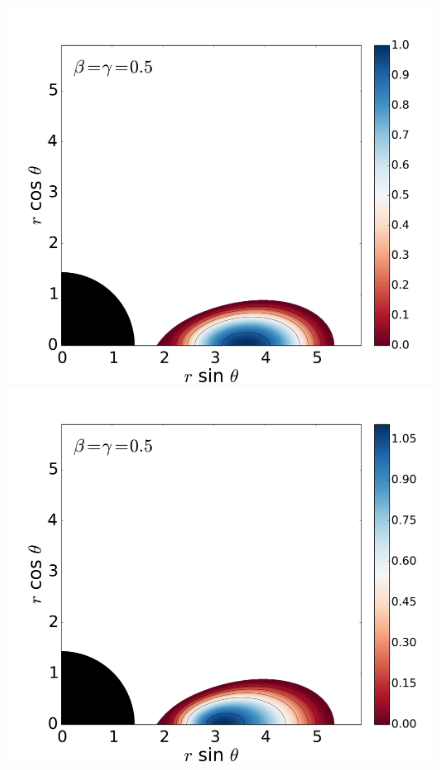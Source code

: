 \documentclass[]{aa}
\begin{document}
\begin{figure}[t]
\centering
\includegraphics[scale=0.14]{figures/fig3a.pdf}
\hspace{-0.3cm}
\includegraphics[scale=0.14]{figures/fig3b.pdf}
\hspace{-0.2cm}

\end{figure}
\end{document}

